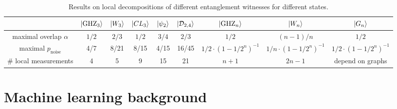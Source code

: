 \documentclass[
aps,
pra,
twocolumn,
floatfix,
]{revtex4-2}
\theoremstyle{plain}
\newtheorem{proposition}{Proposition}
\theoremstyle{definition}
\newcommand{\ew}{W}
\newcommand{\dm}{\rho}
\newcommand{\ghz}{\text{GHZ}}
\newcommand{\noise}{\text{noise}}
\newcommand{\D}{\mathcal{D}}
\begin{document}
\begin{table}[!ht]
\centering
\begin{tabular}{c|c|c|c|c|c|c|c|c}
	 & $\ket{\ghz_3}$ & $\ket{W_3}$ & $\ket{CL_3}$ & $\ket{\psi_2}$ & $\ket{\D_{2,4}}$ & $\ket{\ghz_n}$ & $\ket{W_n}$ & $\ket{G_n}$ \\
	\hline
	maximal overlap $\alpha$ & $1/2$ & $2/3$ & $1/2$ & $3/4$ & $2/3$ & $1/2$ & $(n-1)/n$ & $1/2$ \\
	maximal $p_{\noise}$ & 4/7 & 8/21 & 8/15 & 4/15 & 16/45 & $1/2 \cdot (1-1/2^n)^{-1}$ & $1/n \cdot (1-1/2^n)^{-1}$ & $1/2 \cdot (1-1/2^n)^{-1}$ \\
	\# local measurements & 4 & 5 & 9 & 15 & 21 & $n+1$ & $2n-1$ & depend on graphs \\
	\hline
\end{tabular}
\caption{Results on local decompositions of different entanglement witnesses for different states. \cite{guhneEntanglementDetection2009}}
\label{tab:summary_fidelity_witness}
\end{table}

\section{Machine learning background}

\end{document}
